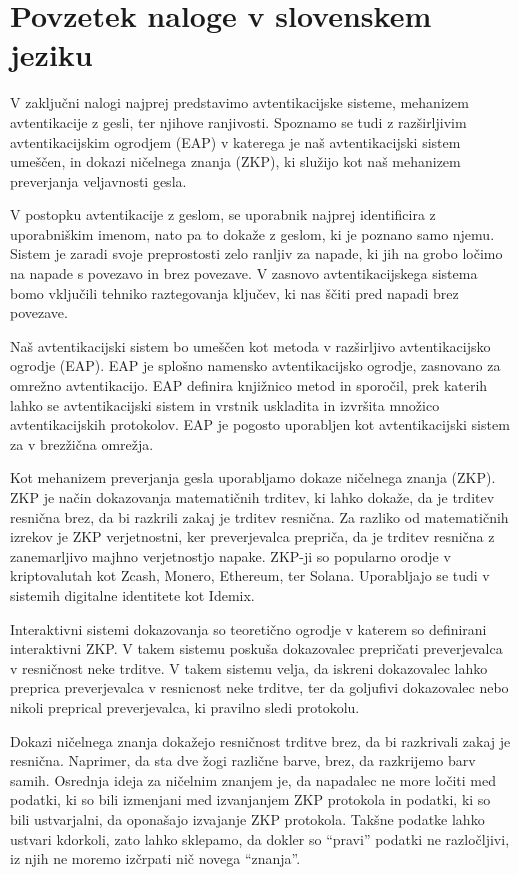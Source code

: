 \chapter{Povzetek naloge v slovenskem jeziku}
V zaključni nalogi najprej predstavimo avtentikacijske sisteme, mehanizem avtentikacije z gesli, ter njihove ranjivosti. Spoznamo se tudi z razširljivim avtentikacijskim ogrodjem (EAP) v katerega je naš avtentikacijski sistem umeščen, in dokazi ničelnega znanja (ZKP), ki služijo kot naš mehanizem preverjanja veljavnosti gesla.

V postopku avtentikacije z geslom, se uporabnik najprej identificira z uporabniškim imenom, nato pa to dokaže z geslom, ki je poznano samo njemu.
Sistem je zaradi svoje preprostosti zelo ranljiv za napade, ki jih na grobo ločimo na napade s povezavo in brez povezave. 
V zasnovo avtentikacijskega sistema bomo vključili tehniko raztegovanja ključev, ki nas ščiti pred napadi brez povezave.

Naš avtentikacijski sistem bo umeščen kot metoda v razširljivo avtentikacijsko ogrodje (EAP).
EAP je splošno namensko avtentikacijsko ogrodje, zasnovano za omrežno avtentikacijo.
EAP definira knjižnico metod in sporočil, prek katerih lahko se avtentikacijski sistem in vrstnik uskladita in izvršita množico avtentikacijskih protokolov. 
EAP je pogosto uporabljen kot avtentikacijski sistem za v brezžična omrežja.

Kot mehanizem preverjanja gesla uporabljamo dokaze ničelnega znanja (ZKP).
ZKP je način dokazovanja matematičnih trditev, ki lahko dokaže, da je trditev resnična brez, da bi razkrili zakaj je trditev resnična.
Za razliko od matematičnih izrekov je ZKP verjetnostni, ker preverjevalca prepriča, da je trditev resnična z zanemarljivo majhno verjetnostjo napake.
ZKP-ji so popularno orodje v kriptovalutah kot Zcash, Monero, Ethereum, ter Solana. Uporabljajo se tudi v sistemih digitalne identitete kot Idemix.


Interaktivni sistemi dokazovanja so teoretično ogrodje v katerem so definirani interaktivni ZKP. V takem sistemu poskuša dokazovalec prepričati preverjevalca v resničnost neke trditve. 
V takem sistemu velja, da iskreni dokazovalec lahko preprica preverjevalca v resnicnost neke trditve, ter da goljufivi dokazovalec nebo nikoli preprical preverjevalca, ki pravilno sledi protokolu.

Dokazi ničelnega znanja dokažejo resničnost trditve brez, da bi razkrivali zakaj je resnična. Naprimer, da sta dve žogi različne barve, brez, da razkrijemo barv samih.
Osrednja ideja za ničelnim znanjem je, da napadalec ne more ločiti med podatki, ki so bili izmenjani med izvanjanjem ZKP protokola in podatki, ki so bili ustvarjalni, da oponašajo izvajanje ZKP protokola.
Takšne podatke lahko ustvari kdorkoli, zato lahko sklepamo, da dokler so “pravi” podatki ne razločljivi, iz njih ne moremo izčrpati nič novega “znanja”.

